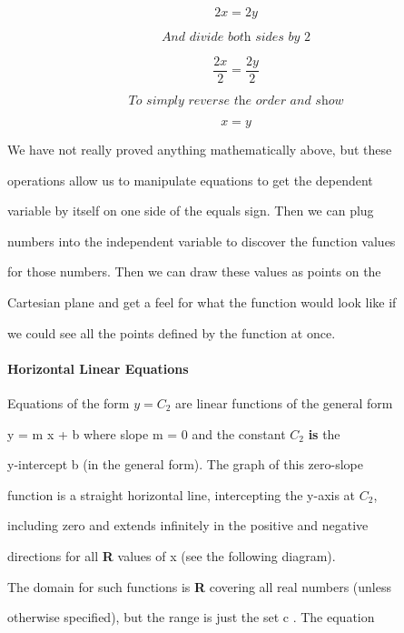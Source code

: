 $$2x  = 2y$$



$$\textit{And divide both sides by 2}$$



$$\frac{2x}{2}  = \frac{2y}{2}$$



$$\textit{To simply reverse the order and show}$$



$$x = y$$



We have not really proved anything mathematically above, but these

operations allow us to manipulate equations to get the dependent

variable by itself on one side of the equals sign. Then we can plug

numbers into the independent variable to discover the function values

for those numbers. Then we can draw these values as points on the

Cartesian plane and get a feel for what the function would look like if

we could see all the points defined by the function at once.



\paragraph{Horizontal Linear Equations}



Equations of the form $y = C_2$ are linear functions of the general form

y = m x + b where slope m = 0 and the constant $C_2$ \textbf{is} the

y-intercept b (in the general form). The graph of this zero-slope

function is a straight horizontal line, intercepting the y-axis at $C_2$,

including zero and extends infinitely in the positive and negative

directions for all \textbf{R} values of x (see the following diagram).






The domain for such functions is \textbf{R} covering all real numbers (unless

otherwise specified), but the range is just the set { c }. The equation

